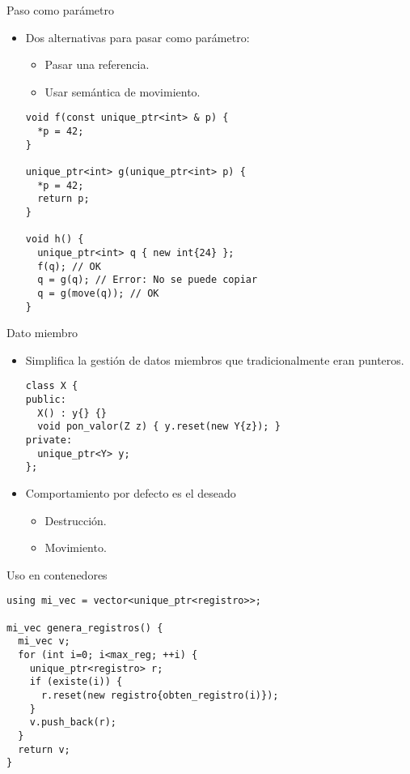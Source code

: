 \begin{frame}[fragile]{Paso como parámetro}
\begin{itemize}
  \item Dos alternativas para pasar como parámetro:
    \begin{itemize}
      \item Pasar una referencia.
      \item Usar semántica de movimiento.
    \end{itemize}
\begin{lstlisting}
void f(const unique_ptr<int> & p) {
  *p = 42;
}

unique_ptr<int> g(unique_ptr<int> p) {
  *p = 42;
  return p;
}

void h() {
  unique_ptr<int> q { new int{24} };
  f(q); // OK
  q = g(q); // Error: No se puede copiar
  q = g(move(q)); // OK
}  
\end{lstlisting}
\end{itemize}
\end{frame}

\begin{frame}[fragile]{Dato miembro}
\begin{itemize}
  \item Simplifica la gestión de datos miembros que tradicionalmente
  eran punteros.
\begin{lstlisting}
class X {
public:
  X() : y{} {}
  void pon_valor(Z z) { y.reset(new Y{z}); }
private:
  unique_ptr<Y> y;
};
\end{lstlisting}
  \item Comportamiento por defecto es el deseado
    \begin{itemize}
      \item Destrucción.
      \item Movimiento.
    \end{itemize}
\end{itemize}
\end{frame}

\begin{frame}[fragile]{Uso en contenedores}
\begin{lstlisting}
using mi_vec = vector<unique_ptr<registro>>;

mi_vec genera_registros() {
  mi_vec v;
  for (int i=0; i<max_reg; ++i) {
    unique_ptr<registro> r;
    if (existe(i)) {
      r.reset(new registro{obten_registro(i)});
    }
    v.push_back(r);
  }
  return v;
}
\end{lstlisting}
\end{frame}


